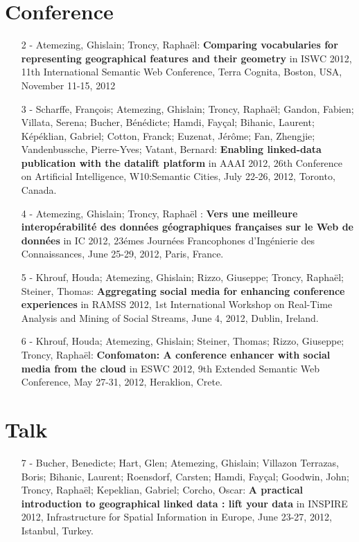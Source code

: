 \documentclass[a4paper,11pt]{report}
\begin{document}
\section*{Conference}
\begin{itemize}
\item [2]- Atemezing, Ghislain; Troncy, Rapha\"{e}l: \textbf{Comparing vocabularies for representing geographical features and their geometry} in ISWC 2012, 11th International Semantic Web Conference, Terra Cognita, Boston, USA, November 11-15, 2012
\item [3]- Scharffe, Fran\c cois; Atemezing, Ghislain; Troncy, Rapha\"{e}l; Gandon, Fabien; Villata, Serena; Bucher, B\'{e}n\'{e}dicte; Hamdi, Fay\c cal; Bihanic, Laurent; K\'{e}p\'{e}klian, Gabriel; Cotton, Franck; Euzenat, J\'{e}r\^{o}me; Fan, Zhengjie; Vandenbussche, Pierre-Yves; Vatant, Bernard: \textbf{Enabling linked-data publication with the datalift platform} in
AAAI 2012, 26th Conference on Artificial Intelligence, W10:Semantic Cities, July 22-26, 2012, Toronto, Canada.
\item [4]- Atemezing, Ghislain; Troncy, Rapha\"{e}l : \textbf{Vers une meilleure interop\'{e}rabilit\'{e} des donn\'{e}es g\'{e}ographiques fran\c caises sur le Web de donn\'{e}es} in IC 2012, 23\'{e}mes Journ\'{e}es Francophones d'Ing\'{e}nierie des Connaissances, June 25-29, 2012, Paris, France.
\item [5]- Khrouf, Houda; Atemezing, Ghislain; Rizzo, Giuseppe; Troncy, Rapha\"{e}l; Steiner, Thomas:
\textbf{Aggregating social media for enhancing conference experiences} in RAMSS 2012, 1st International Workshop on Real-Time Analysis and Mining of Social Streams, June 4, 2012, Dublin, Ireland.
\item [6]- Khrouf, Houda; Atemezing, Ghislain; Steiner, Thomas; Rizzo, Giuseppe; Troncy, Rapha\"{e}l: 
\textbf{Confomaton: A conference enhancer with social media from the cloud} in ESWC 2012, 9th Extended Semantic Web Conference, May 27-31, 2012, Heraklion, Crete.
\end{itemize}

\section*{Talk}
\begin{itemize}
\item [7]- Bucher, Benedicte; Hart, Glen; Atemezing, Ghislain; Villazon Terrazas, Boris; Bihanic, Laurent; Roensdorf, Carsten; Hamdi, Fay\c cal; Goodwin, John; Troncy, Rapha\"{e}l; Kepeklian, Gabriel; Corcho, Oscar: 
\textbf{A practical introduction to geographical linked data : lift your data} in 
INSPIRE 2012, Infrastructure for Spatial Information in Europe, June 23-27, 2012, Istanbul, Turkey.
\end{itemize}
\end{document}
